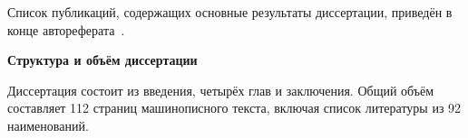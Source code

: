 Список публикаций, содержащих основные результаты диссертации, приведён в конце
автореферата~\cite{m01,m02,m03,m04,m05,m06,m07,m08,m09,m10,m11,m12}.

\vspace{2ex}
\noindent \textbf{Структура и объём диссертации}

Диссертация состоит из введения, четырёх глав и заключения. Общий объём
составляет 112 страниц машинописного текста, включая список литературы из 92
наименований.

